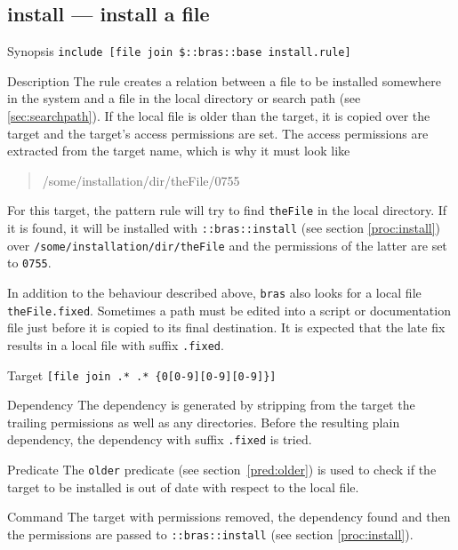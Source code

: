 \documentclass[11pt,bibtotoc,idxtotoc]{scrreprt}
\makeatletter
\newcommand{\bras}{\texttt{bras}}
\newcommand{\indextt}[1]{\index{#1@\texttt{#1}}}
\newcommand{\Indextt}[1]{\texttt{#1}\index{#1@\texttt{#1}}}
\makeatother
\begin{document}
\subsection{install --- install a file}
\label{sec:install}
\begin{Describe}
\item[Synopsis] \texttt{include [file join \$::bras::base
    install.rule]}
\item[Description] The rule creates a relation between a
  file to be installed somewhere in the system and a file in the local 
  directory or search path (see \ref{sec:searchpath}). If the local
  file is older than the target, it is copied over the target and the
  target's access permissions are set. The access permissions are
  extracted from the target name, which is why it must look like
  \begin{quote}\ttfamily
    /some/installation/dir/theFile/0755
  \end{quote}
  For this target, the pattern rule will try to find \texttt{theFile}
  in the local directory. If it is found, it will be installed with
  \texttt{::bras::install}\indextt{install} (see section
  \ref{proc:install}) over \texttt{/some/installation/dir/theFile} and
  the permissions of the latter are set to \texttt{0755}.

  In addition to the behaviour described above, \bras{} also looks for
  a local file \texttt{theFile.fixed}. Sometimes a path must be edited 
  into a script or documentation file just before it is copied to its
  final destination. It is expected that the late fix results in a
  local file with suffix \texttt{.fixed}.
\item[Target] \verb|[file join .* .* {0[0-9][0-9][0-9]}]|
\item[Dependency] The dependency is generated by stripping from the
  target the trailing permissions as well as any directories. Before
  the resulting plain dependency, the dependency with suffix
  \texttt{.fixed} is tried.
\item[Predicate] The \Indextt{older} predicate (see
  section~\ref{pred:older}) is used to check if the 
  target to be installed is out of date with respect to the local
  file. 
\item[Command] The target with permissions removed, the dependency
  found and then the permissions are passed to
  \texttt{::bras::install} (see section \ref{proc:install}).
\end{Describe}
\end{document}
